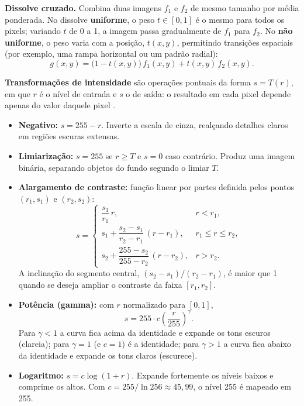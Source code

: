 \documentclass[11pt,a4paper]{article}
\begin{document}
\textbf{Dissolve cruzado.} Combina duas imagens $f_1$ e $f_2$ de mesmo tamanho por média
ponderada. No dissolve \textbf{uniforme}, o peso $t \in [0, 1]$ é o mesmo para todos os
pixels; variando $t$ de 0 a 1, a imagem passa gradualmente de $f_1$ para $f_2$. No
\textbf{não uniforme}, o peso varia com a posição, $t(x, y)$, permitindo transições
espaciais (por exemplo, uma rampa horizontal ou um padrão radial):
\begin{equation}
  g(x, y) = \big(1 - t(x,y)\big)\, f_1(x, y) + t(x,y)\, f_2(x, y).
\end{equation}

\textbf{Transformações de intensidade} são operações pontuais da forma $s = T(r)$, em que
$r$ é o nível de entrada e $s$ o de saída: o resultado em cada pixel depende apenas do valor
daquele pixel \cite{gonzalez}.

\begin{itemize}
  \item \textbf{Negativo:} $s = 255 - r$. Inverte a escala de cinza, realçando detalhes
        claros em regiões escuras extensas.
  \item \textbf{Limiarização:} $s = 255$ se $r \geq T$ e $s = 0$ caso contrário. Produz uma
        imagem binária, separando objetos do fundo segundo o limiar $T$.
  \item \textbf{Alargamento de contraste:} função linear por partes definida pelos pontos
        $(r_1, s_1)$ e $(r_2, s_2)$:
\begin{equation}
  s = \begin{cases}
    \dfrac{s_1}{r_1}\, r, & r < r_1,\\[2mm]
    s_1 + \dfrac{s_2 - s_1}{r_2 - r_1}\,(r - r_1), & r_1 \le r \le r_2,\\[2mm]
    s_2 + \dfrac{255 - s_2}{255 - r_2}\,(r - r_2), & r > r_2.
  \end{cases}
\end{equation}
        A inclinação do segmento central, $(s_2 - s_1)/(r_2 - r_1)$, é maior que 1 quando
        se deseja ampliar o contraste da faixa $[r_1, r_2]$.
  \item \textbf{Potência (gamma):} com $r$ normalizado para $[0, 1]$,
\begin{equation}
  s = 255 \cdot c \left(\frac{r}{255}\right)^{\gamma}.
\end{equation}
        Para $\gamma < 1$ a curva fica acima da identidade e expande os tons escuros
        (clareia); para $\gamma = 1$ (e $c = 1$) é a identidade; para $\gamma > 1$ a curva
        fica abaixo da identidade e expande os tons claros (escurece).
  \item \textbf{Logaritmo:} $s = c \log(1 + r)$. Expande fortemente os níveis baixos e
        comprime os altos. Com $c = 255/\ln 256 \approx 45{,}99$, o nível 255 é mapeado
        em 255.
\end{itemize}
\end{document}
